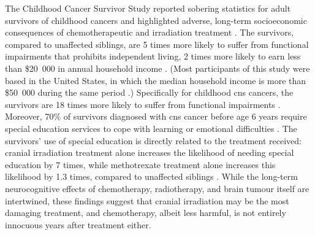 The Childhood Cancer Survivor Study reported sobering statistics for adult survivors of childhood cancers and highlighted adverse, long-term socioeconomic consequences of chemotherapeutic and irradiation treatment . The survivors, compared to unaffected siblings, are 5 times more likely to suffer from functional impairments that prohibits independent living, 2 times more likely to earn less than \$20~000 in annual household income . (Most participants of this study were based in the United States, in which the median household income is more than \$50~000 during the same period .) Specifically for childhood \gls{cns} cancers, the survivors are 18 times more likely to suffer from functional impairments . Moreover, 70\% of survivors diagnosed with \gls{cns} cancer before age 6 years require special education services to cope with learning or emotional difficulties . The survivors' use of special education is directly related to the treatment received: cranial irradiation treatment alone increases the likelihood of needing special education by 7 times, while methotrexate treatment alone increases this likelihood by 1.3 times, compared to unaffected siblings . While the long-term neurocognitive effects of chemotherapy, radiotherapy, and brain tumour itself are intertwined, these findings suggest that cranial irradiation may be the most damaging treatment, and chemotherapy, albeit less harmful, is not entirely innocuous years after treatment either.

